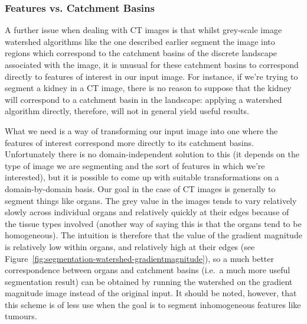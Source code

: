 \subsubsection{Features vs. Catchment Basins}

A further issue when dealing with CT images is that whilst grey-scale image watershed algorithms like the one described earlier segment the image into regions which correspond to the catchment basins of the discrete landscape associated with the image, it is unusual for these catchment basins to correspond directly to features of interest in our input image. For instance, if we're trying to segment a kidney in a CT image, there is no reason to suppose that the kidney will correspond to a catchment basin in the landscape: applying a watershed algorithm directly, therefore, will not in general yield useful results.

What we need is a way of transforming our input image into one where the features of interest correspond more directly to its catchment basins. Unfortunately there is no domain-independent solution to this (it depends on the type of image we are segmenting and the sort of features in which we're interested), but it is possible to come up with suitable transformations on a domain-by-domain basis. Our goal in the case of CT images is generally to segment things like organs. The grey value in the images tends to vary relatively slowly across individual organs and relatively quickly at their edges because of the tissue types involved (another way of saying this is that the organs tend to be homogeneous). The intuition is therefore that the value of the gradient magnitude is relatively low within organs, and relatively high at their edges (see Figure~\ref{fig:segmentation-watershed-gradientmagnitude}), so a much better correspondence between organs and catchment basins (i.e.~a much more useful segmentation result) can be obtained by running the watershed on the gradient magnitude image instead of the original input. It should be noted, however, that this scheme is of less use when the goal is to segment inhomogeneous features like tumours.

